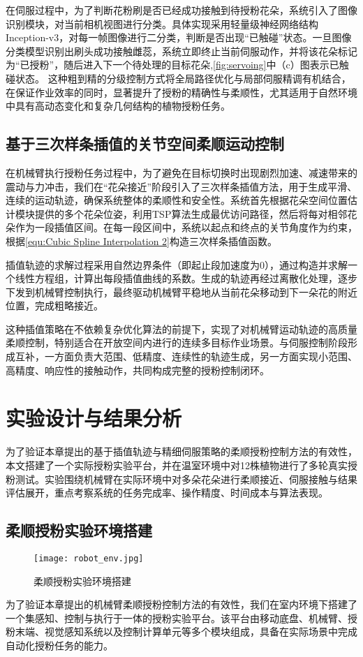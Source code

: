 在伺服过程中，为了判断花粉刷是否已经成功接触到待授粉花朵，系统引入了图像识别模块，对当前相机视图进行分类。具体实现采用轻量级神经网络结构Inception-v3，对每一帧图像进行二分类，判断是否出现“已触碰”状态。一旦图像分类模型识别出刷头成功接触雌蕊，系统立即终止当前伺服动作，并将该花朵标记为“已授粉”，随后进入下一个待处理的目标花朵,\cref{fig:servoing}中（c）图表示已触碰状态。
这种粗到精的分级控制方式将全局路径优化与局部伺服精调有机结合，在保证作业效率的同时，显著提升了授粉的精确性与柔顺性，尤其适用于自然环境中具有高动态变化和复杂几何结构的植物授粉任务。

\subsection{基于三次样条插值的关节空间柔顺运动控制}
在机械臂执行授粉任务过程中，为了避免在目标切换时出现剧烈加速、减速带来的震动与力冲击，我们在“花朵接近”阶段引入了三次样条插值方法，用于生成平滑、连续的运动轨迹，确保系统整体的柔顺性和安全性。系统首先根据花朵空间位置估计模块提供的多个花朵位姿，利用TSP算法生成最优访问路径，然后将每对相邻花朵作为一段插值区间。在每一段区间中，系统以起点和终点的关节角度作为约束，根据\cref{equ:Cubic Spline Interpolation 2}构造三次样条插值函数。

插值轨迹的求解过程采用自然边界条件（即起止段加速度为0），通过构造并求解一个线性方程组，计算出每段插值曲线的系数。生成的轨迹再经过离散化处理，逐步下发到机械臂控制执行，最终驱动机械臂平稳地从当前花朵移动到下一朵花的附近位置，完成粗略接近。

这种插值策略在不依赖复杂优化算法的前提下，实现了对机械臂运动轨迹的高质量柔顺控制，特别适合在开放空间内进行的连续多目标作业场景。与伺服控制阶段形成互补，一方面负责大范围、低精度、连续性的轨迹生成，另一方面实现小范围、高精度、响应性的接触动作，共同构成完整的授粉控制闭环。

\section{实验设计与结果分析}
为了验证本章提出的基于插值轨迹与精细伺服策略的柔顺授粉控制方法的有效性，本文搭建了一个实际授粉实验平台，并在温室环境中对12株植物进行了多轮真实授粉测试。实验围绕机械臂在实际环境中对多朵花朵进行柔顺接近、伺服接触与结果评估展开，重点考察系统的任务完成率、操作精度、时间成本与算法表现。
\subsection{柔顺授粉实验环境搭建}
\begin{figure}[htb]
	\texttt{[image: robot\_env.jpg]}
	\caption[柔顺授粉实验环境搭建]{柔顺授粉实验环境搭建} %
	\label{fig:robot_env}
\end{figure}
为了验证本章提出的机械臂柔顺授粉控制方法的有效性，我们在室内环境下搭建了一个集感知、控制与执行于一体的授粉实验平台。该平台由移动底盘、机械臂、授粉末端、视觉感知系统以及控制计算单元等多个模块组成，具备在实际场景中完成自动化授粉任务的能力。

